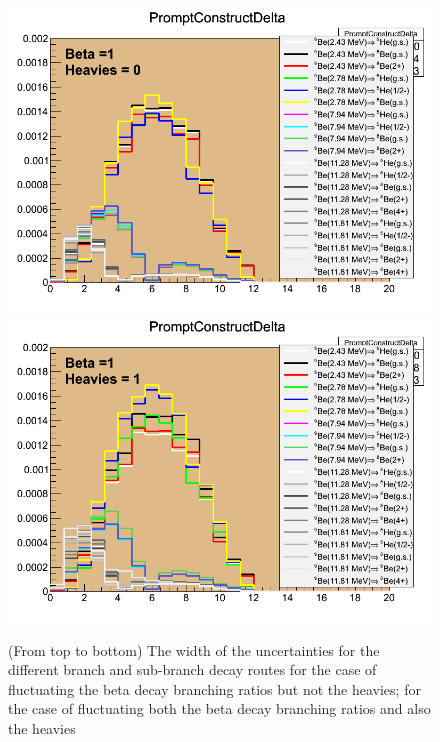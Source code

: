 \documentclass{JINST}
\begin{document}
       \begin{figure}[htp]
 \begin{center}
  
  \includegraphics[scale=0.45]{canvas_1_0.png}
  \includegraphics[scale=0.45]{canvas_1_1.png}
   \label{BRUncert_1}
    \end{center}
    \caption{ (From top to bottom) The width of the uncertainties for the different branch and sub-branch decay routes for the case of fluctuating
    the beta decay branching ratios but not the heavies; for the case of fluctuating both the beta decay branching ratios and also the heavies}
    \end{figure}
    
\end{document}
